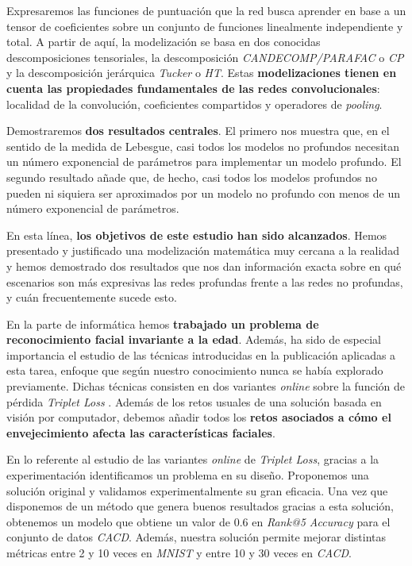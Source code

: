 Expresaremos las funciones de puntuación que la red busca aprender en base a un tensor de coeficientes sobre un conjunto de funciones linealmente independiente y total. A partir de aquí, la modelización se basa en dos conocidas descomposiciones tensoriales, la descomposición \textit{CANDECOMP/PARAFAC} o \textit{CP} y la descomposición jerárquica \textit{Tucker} o \textit{HT}. Estas \textbf{modelizaciones tienen en cuenta las propiedades fundamentales de las redes convolucionales}: localidad de la convolución, coeficientes compartidos y operadores de \textit{pooling}.

Demostraremos \textbf{dos resultados centrales}. El primero nos muestra que, en el sentido de la medida de Lebesgue, casi todos los modelos no profundos necesitan un número exponencial de parámetros para implementar un modelo profundo. El segundo resultado añade que, de hecho, casi todos los modelos profundos no pueden ni siquiera ser aproximados por un modelo no profundo con menos de un número exponencial de parámetros.

En esta línea, \textbf{los objetivos de este estudio han sido alcanzados}. Hemos presentado y justificado una modelización matemática muy cercana a la realidad y hemos demostrado dos resultados que nos dan información exacta sobre en qué escenarios son más expresivas las redes profundas frente a las redes no profundas, y cuán frecuentemente sucede esto.

En la parte de informática hemos \textbf{trabajado un problema de reconocimiento facial invariante a la edad}. Además, ha sido de especial importancia el estudio de las técnicas introducidas en la publicación \cite{informatica:principal} aplicadas a esta tarea, enfoque que según nuestro conocimiento nunca se había explorado previamente. Dichas técnicas consisten en dos variantes \textit{online} sobre la función de pérdida \textit{Triplet Loss} \cite{informatica:principal}.  Además de los retos usuales de una solución basada en visión por computador, debemos añadir todos los \textbf{retos asociados a cómo el envejecimiento afecta las características faciales}.

En lo referente al estudio de las variantes \textit{online} de \textit{Triplet Loss}, gracias a la experimentación identificamos un problema en su diseño. Proponemos una solución original y validamos experimentalmente su gran eficacia. Una vez que disponemos de un método que genera buenos resultados gracias a esta solución, obtenemos un modelo que obtiene un valor de 0.6 en \textit{Rank@5 Accuracy} para el conjunto de datos \textit{CACD}. Además, nuestra solución permite mejorar distintas métricas entre 2 y 10 veces en \textit{MNIST} y entre 10 y 30 veces en \textit{CACD}.

